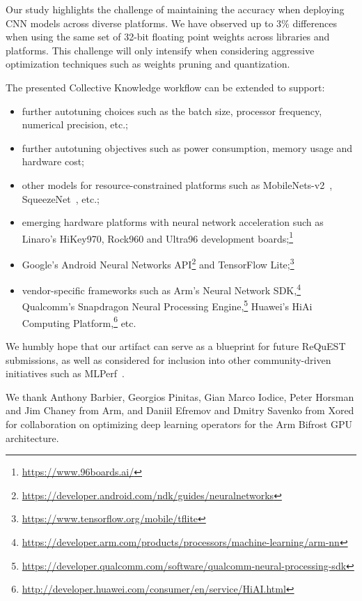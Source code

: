 \documentclass[sigplan]{acmart}
\begin{document}
Our study highlights the challenge of maintaining the accuracy when deploying
CNN models across diverse platforms.
%
We have observed up to $3\%$ differences when using the same set of 32-bit
floating point weights across libraries and platforms.
%
This challenge will only intensify when considering aggressive optimization
techniques such as weights pruning and quantization.

The presented Collective Knowledge workflow can be extended to support:
\begin{itemize}

  \item further autotuning choices such as the batch size, processor frequency, numerical precision, etc.;

  \item further autotuning objectives such as power consumption, memory usage and hardware cost;

  \item other models for resource-constrained platforms such as MobileNets-v2~\cite{Sandler:MobileNets-v2}, SqueezeNet~\cite{Iandola:SqueezeNet}, etc.;

  \item emerging hardware platforms with neural network acceleration such as Linaro's HiKey970, Rock960 and Ultra96 development boards;\footnote{\url{https://www.96boards.ai/}}

  \item Google's Android Neural Networks API\footnote{\url{https://developer.android.com/ndk/guides/neuralnetworks}} and TensorFlow Lite;\footnote{\url{https://www.tensorflow.org/mobile/tflite}}

  \item vendor-specific frameworks such as Arm's Neural Network SDK,\footnote{\url{https://developer.arm.com/products/processors/machine-learning/arm-nn}} Qualcomm's Snapdragon Neural Processing Engine,\footnote{\url{https://developer.qualcomm.com/software/qualcomm-neural-processing-sdk}} Huawei's HiAi Computing Platform,\footnote{\url{http://developer.huawei.com/consumer/en/service/HiAI.html}} etc.

\end{itemize}

We humbly hope that our artifact can serve as a blueprint for future ReQuEST
submissions, as well as considered for inclusion into other community-driven
initiatives such as MLPerf~\cite{mlperf}.


\begin{acks} 

We thank Anthony Barbier, Georgios Pinitas, Gian Marco Iodice, Peter Horsman
and Jim Chaney from Arm, and Daniil Efremov and Dmitry Savenko from Xored for
collaboration on optimizing deep learning operators for the Arm Bifrost GPU
architecture.

\end{acks}
\end{document}
